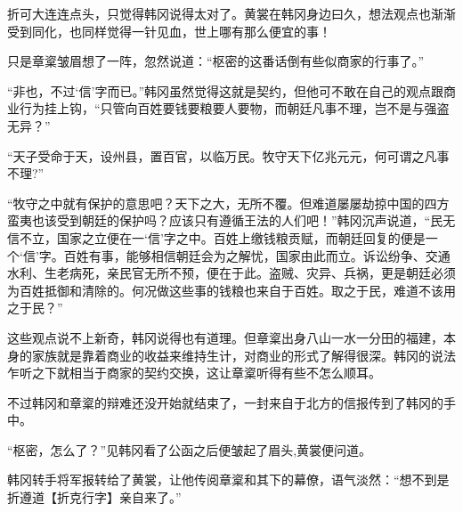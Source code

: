 折可大连连点头，只觉得韩冈说得太对了。黄裳在韩冈身边曰久，想法观点也渐渐受到同化，也同样觉得一针见血，世上哪有那么便宜的事！

只是章楶皱眉想了一阵，忽然说道：“枢密的这番话倒有些似商家的行事了。”

“非也，不过‘信’字而已。”韩冈虽然觉得这就是契约，但他可不敢在自己的观点跟商业行为挂上钩，“只管向百姓要钱要粮要人要物，而朝廷凡事不理，岂不是与强盗无异？”

“天子受命于天，设州县，置百官，以临万民。牧守天下亿兆元元，何可谓之凡事不理?”

“牧守之中就有保护的意思吧？天下之大，无所不覆。但难道屡屡劫掠中国的四方蛮夷也该受到朝廷的保护吗？应该只有遵循王法的人们吧！”韩冈沉声说道，“民无信不立，国家之立便在一‘信’字之中。百姓上缴钱粮贡赋，而朝廷回复的便是一个‘信’字。百姓有事，能够相信朝廷会为之解忧，国家由此而立。诉讼纷争、交通水利、生老病死，亲民官无所不预，便在于此。盗贼、灾异、兵祸，更是朝廷必须为百姓抵御和清除的。何况做这些事的钱粮也来自于百姓。取之于民，难道不该用之于民？”

这些观点说不上新奇，韩冈说得也有道理。但章楶出身八山一水一分田的福建，本身的家族就是靠着商业的收益来维持生计，对商业的形式了解得很深。韩冈的说法乍听之下就相当于商家的契约交换，这让章楶听得有些不怎么顺耳。

不过韩冈和章楶的辩难还没开始就结束了，一封来自于北方的信报传到了韩冈的手中。

“枢密，怎么了？”见韩冈看了公函之后便皱起了眉头,黄裳便问道。

韩冈转手将军报转给了黄裳，让他传阅章楶和其下的幕僚，语气淡然：“想不到是折遵道【折克行字】亲自来了。”
